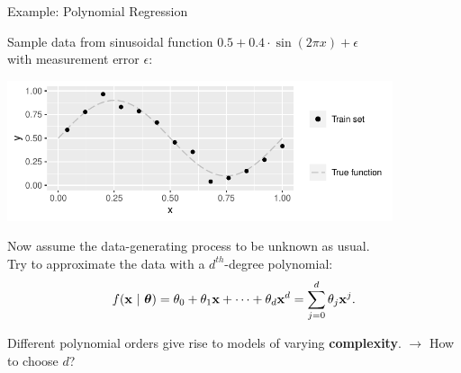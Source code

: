 \documentclass[11pt,compress,t,notes=noshow, xcolor=table]{beamer}
\begin{document}
\begin{vbframe}{Example: Polynomial Regression}

Sample data from sinusoidal function
$0.5 + 0.4 \cdot \sin (2 \pi x) + \epsilon$\\
with measurement error $\epsilon$:

\vfill

\begin{center}
  \includegraphics[width=0.85\textwidth]{figure/eval_train_1}
\end{center}

Now assume the data-generating process to be unknown as usual.\\
Try to approximate the data with a $d^{th}$-degree polynomial:
\[ f(\mathbf{x} ~|~ \bm{\theta}) = \theta_0 + \theta_1 \mathbf{x} + \cdots + \theta_d \mathbf{x}^d = \sum_{j = 0}^{d}
\theta_j \mathbf{x}^j\text. \]

\framebreak

Different polynomial orders give rise to models of varying \textbf{complexity}.
$\rightarrow$ How to choose $d$?

\vfill


\end{vbframe}
\end{document}
